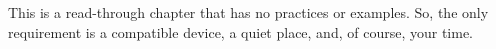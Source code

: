 This is a read-through chapter that has no practices or examples. So, the only requirement is a compatible device, a quiet place, and, of course, your time.